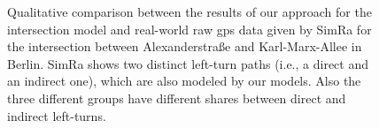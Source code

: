 \begin{figure}
    \centering
    \hfill
    \hfill
    \caption{%
        Qualitative comparison between the results of our approach for the intersection model and real-world raw \ac{gps} data given by SimRa for the intersection between Alexanderstraße and Karl-Marx-Allee in Berlin.
        SimRa shows two distinct left-turn paths (i.e., a direct and an indirect one), which are also modeled by our models.
        Also the three different groups have different shares between direct and indirect left-turns.
    }%
    \label{fig:eval_im_traj_new}
\end{figure}

